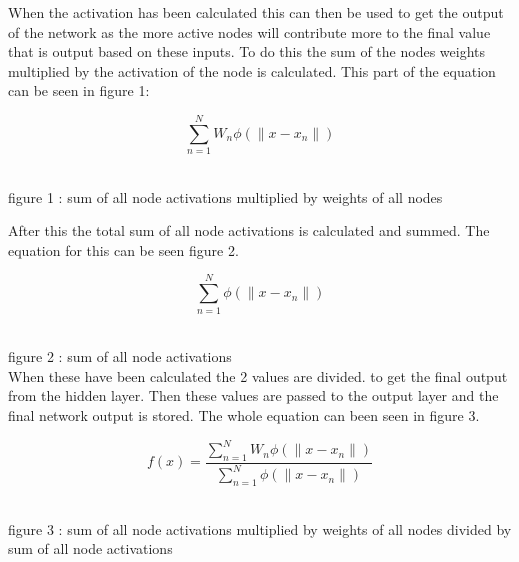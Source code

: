 \documentclass{IEEEtran}[11pt]
\begin{document}
\begin{flushleft}
  When the activation has been calculated this can then be used to get the output of the network
  as the more active nodes will contribute more to the final value that is output based on these inputs.
  To do this the sum of the nodes weights multiplied by the activation of the node is calculated.
  This part of the equation can be seen in figure 1:
  \vspace{3mm}

  $$\sum_{n=1}^{N}W _n\phi(\|x-x_n\|) $$
  \\
  \vspace{1.5mm}

  {\footnotesize figure 1 : sum of all node activations multiplied by weights of all nodes}

  \vspace{3mm}
  After this the total sum of all node activations is calculated and summed.
  The equation for this can be seen figure 2.

  \vspace{3mm}

  $$\sum_{n=1}^{N}\phi(\|x-x_n\|) $$
  \\
  \vspace{1.5mm}

  {\footnotesize figure 2 : sum of all node activations}
  \\
  \vspace{3mm}
  When these have been calculated the 2 values are divided. to get the final
  output from the hidden layer. Then these values are passed to the output layer
  and the final network output is stored.
  The whole equation can been seen in figure 3.

  \vspace{3mm}

  $$f(x)=\frac{\sum_{n=1}^{N}W _n\phi(\|x-x_n\|)}{\sum_{n=1}^{N}\phi(\|x-x_n\|)}$$
  \\
  \vspace{1.5mm}

  {\footnotesize figure 3 : sum of all node activations multiplied by weights of all nodes
  divided by sum of all node activations}
  \\
  \vspace{3mm}

\end{flushleft}
\end{document}
